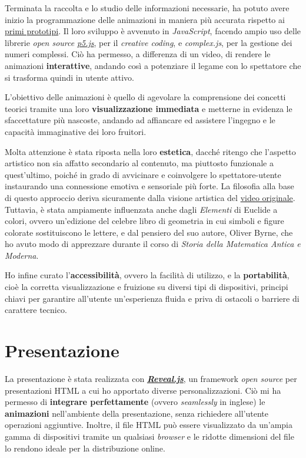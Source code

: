 \documentclass[
]{book}
\begin{document}
Terminata la raccolta e lo studio delle informazioni necessarie, ha potuto avere inizio la programmazione delle animazioni in maniera più accurata rispetto ai \protect\hyperlink{prototipi}{primi prototipi}.
Il loro sviluppo è avvenuto in \emph{JavaScript}, facendo ampio uso delle librerie \emph{open source} \href{https://p5js.org/}{\emph{p5.js}}, per il \emph{creative coding}, e \emph{complex.js}, per la gestione dei numeri complessi. Ciò ha permesso, a differenza di un video, di rendere le animazioni \textbf{interattive}, andando così a potenziare il legame con lo spettatore che si trasforma quindi in utente attivo.

L'obiettivo delle animazioni è quello di agevolare la comprensione dei concetti teorici tramite una loro \textbf{visualizzazione immediata} e metterne in evidenza le sfaccettature più nascoste, andando ad affiancare ed assistere l'ingegno e le capacità immaginative dei loro fruitori.

Molta attenzione è stata riposta nella loro \textbf{estetica}, dacché ritengo che l'aspetto artistico non sia affatto secondario al contenuto, ma piuttosto funzionale a quest'ultimo, poiché in grado di avvicinare e coinvolgere lo spettatore-utente instaurando una connessione emotiva e sensoriale più forte.
La filosofia alla base di questo approccio deriva sicuramente dalla visione artistica del \href{https://www.youtube.com/watch?v=r6sGWTCMz2k}{video originale}. Tuttavia, è stata ampiamente influenzata anche dagli \emph{Elementi} di Euclide a colori, ovvero un'edizione del celebre libro di geometria in cui simboli e figure colorate sostituiscono le lettere, e dal pensiero del suo autore, Oliver Byrne, che ho avuto modo di apprezzare durante il corso di \emph{Storia della Matematica Antica e Moderna}.

Ho infine curato l'\textbf{accessibilità}, ovvero la facilità di utilizzo, e la \textbf{portabilità}, cioè la corretta visualizzazione e fruizione su diversi tipi di dispositivi, principi chiavi per garantire all'utente un'esperienza fluida e priva di ostacoli o barriere di carattere tecnico.

\hypertarget{presentazione}{%
\section{Presentazione}\label{presentazione}}

La presentazione è stata realizzata con \href{https://revealjs.com/}{\emph{\textbf{Reveal.js}}}, un framework \emph{open source} per presentazioni HTML a cui ho apportato diverse personalizzazioni.
Ciò mi ha permesso di \textbf{integrare perfettamente} (ovvero \emph{seamlessly} in inglese) le \textbf{animazioni} nell'ambiente della presentazione, senza richiedere all'utente operazioni aggiuntive. Inoltre, il file HTML può essere visualizzato da un'ampia gamma di dispositivi tramite un qualsiasi \emph{browser} e le ridotte dimensioni del file lo rendono ideale per la distribuzione online.
\end{document}
